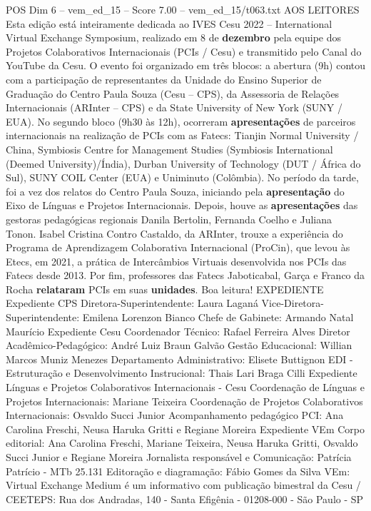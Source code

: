 \begin{textsample}{POS Dim 6 – vem\_ed\_15 – Score 7.00 – vem\_ed\_15/t063.txt}  \label{ex:f6_pos_019}
AOS LEITORES Esta edição está inteiramente dedicada ao IVES Cesu 2022 – International Virtual Exchange Symposium, realizado em 8 de \textbf{dezembro} pela equipe dos Projetos Colaborativos Internacionais (PCIs / Cesu) e transmitido pelo Canal do YouTube da Cesu.
O evento foi organizado em três blocos: a abertura (9h) contou com a participação de representantes da Unidade do Ensino Superior de Graduação do Centro Paula Souza (Cesu – CPS), da Assessoria de Relações Internacionais (ARInter – CPS) e da State University of New York (SUNY / EUA).
No segundo bloco (9h30 às 12h), ocorreram \textbf{apresentações} de parceiros internacionais na realização de PCIs com as Fatecs: Tianjin Normal University / China, Symbiosis Centre for Management Studies (Symbiosis International (Deemed University)/Índia), Durban University of Technology (DUT / África do Sul), SUNY COIL Center (EUA) e Uniminuto (Colômbia).
No período da tarde, foi a vez dos relatos do Centro Paula Souza, iniciando pela \textbf{apresentação} do Eixo de Línguas e Projetos Internacionais.
Depois, houve as \textbf{apresentações} das gestoras pedagógicas regionais Danila Bertolin, Fernanda Coelho e Juliana Tonon.
Isabel Cristina Contro Castaldo, da ARInter, trouxe a experiência do Programa de Aprendizagem Colaborativa Internacional (ProCin), que levou às Etecs, em 2021, a prática de Intercâmbios Virtuais desenvolvida nos PCIs das Fatecs desde 2013.
Por fim, professores das Fatecs Jaboticabal, Garça e Franco da Rocha \textbf{relataram} PCIs em suas \textbf{unidades}.
Boa leitura!
EXPEDIENTE Expediente CPS Diretora-Superintendente: Laura Laganá Vice-Diretora-Superintendente: Emilena Lorenzon Bianco Chefe de Gabinete: Armando Natal Maurício Expediente Cesu Coordenador Técnico: Rafael Ferreira Alves Diretor Acadêmico-Pedagógico: André Luiz Braun Galvão Gestão Educacional: Willian Marcos Muniz Menezes Departamento Administrativo: Elisete Buttignon EDI - Estruturação e Desenvolvimento Instrucional: Thais Lari Braga Cilli Expediente Línguas e Projetos Colaborativos Internacionais - Cesu Coordenação de Línguas e Projetos Internacionais: Mariane Teixeira Coordenação de Projetos Colaborativos Internacionais: Osvaldo Succi Junior Acompanhamento pedagógico PCI: Ana Carolina Freschi, Neusa Haruka Gritti e Regiane Moreira Expediente VEm Corpo editorial: Ana Carolina Freschi, Mariane Teixeira, Neusa Haruka Gritti, Osvaldo Succi Junior e Regiane Moreira Jornalista responsável e Comunicação: Patrícia Patrício - MTb 25.131 Editoração e diagramação: Fábio Gomes da Silva VEm: Virtual Exchange Medium é um informativo com publicação bimestral da Cesu / CEETEPS: Rua dos Andradas, 140 - Santa Efigênia - 01208-000 - São Paulo - SP

\end{textsample}
